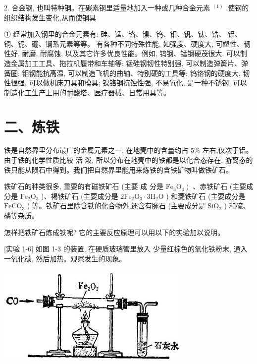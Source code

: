 \documentclass[10pt]{article}
\begin{document}
2. 合金钢, 也叫特种钢。在碳素钢里适量地加入一种或几种合金元素 \({}^{\left( 1\right) }\) ,使钢的组织结构发生变化,从而使钢具

① 经常加入钢里的合金元素有: 硅、锰、铬、镍、钨、钼、钒、钛、锆、 铝、铜、铌、硼、镧系元素等等。 有各种不同特殊性能, 如强度、硬度大, 可塑性、韧性好, 耐磨, 耐腐蚀, 以及其它许多优良性能。例如, 钨钢、锰钢硬茂很大, 可以制造金属加工工具、拖拉机履带和车轴等; 锰硅钢韧性特别强, 可以制造弹簧片、弹簧圈; 钼钢能抗高温, 可以制造飞机的曲轴、特别硬的工具等; 钨铬钢的硬度大, 韧性很强, 可以做机床刀具和模具; 镍铬钢抗蚀性强, 不易氧化, 是一种不锈钢, 可以制造化工生产上用的耐酸塔、医疗器械、日常用具等。

\section*{二、炼铁}

铁是自然界里分布最广的金属元素之一, 在地壳中的含量约占 \(5\%\) 左右,仅次于铝。由于铁的化学性质比较 活 泼, 所以分布在地壳中的铁都是以化合态存在, 游离态的铁只能从陨石中得到。我们把自然界里能用来炼铁的含铁矿物叫做铁矿石。

铁矿石的种类很多, 重要的有磁铁矿石 (主要 成 分是 \(\left. {{\mathrm{{Fe}}}_{3}{\mathrm{O}}_{4}}\right)\) 、赤铁矿石 (主要成分是 \({\mathrm{{Fe}}}_{2}{\mathrm{O}}_{3}\) )、褐铁矿石 (主要成分是 \(2{\mathrm{{Fe}}}_{2}{\mathrm{O}}_{3} \cdot 3{\mathrm{H}}_{2}\mathrm{O}\) ) 和菱铁矿石 (主要成分是 \({\mathrm{{FeCO}}}_{3}\) ) 等。铁矿石里除含铁的化合物外,还含有脉石 (主要成分是 \({\mathrm{{SiO}}}_{2}\) ) 和硫、 磷等杂质。

怎样把铁矿石炼成铁呢? 它的主要反应原理可以用以下的实验加以说明。

[实验 1-6] 如图 1-3 的装置, 在硬质玻璃管里放入 少量红棕色的氧化铁粉末, 通入一氧化碳, 然后加热。观察发生的现象。

\begin{center}
\includegraphics[max width=0.7\textwidth]{images/01912d16-be99-77bb-9535-4f3ed8d9946f_28_207735.jpg}
\end{center}
\end{document}
